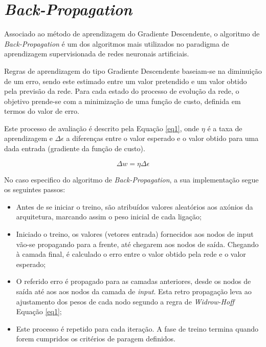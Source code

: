 \section{\textit{Back-Propagation}}
\label{sec:backProp}

Associado ao método de aprendizagem do Gradiente Descendente, o algoritmo de \textit{Back-Propagation} é um dos algoritmos mais utilizados no paradigma de aprendizagem supervisionada de redes neuronais artificiais. 

Regras de aprendizagem do tipo Gradiente Descendente baseiam-se na diminuição de um erro, sendo este estimado entre um valor pretendido e um valor obtido pela previsão da rede. \cite{Haykin-ANN}
Para cada estado do processo de evolução da rede, o objetivo prende-se com a minimização de uma função de custo, definida em termos do valor de erro. 

Este processo de avaliação é descrito pela Equação \ref{eq1}, onde $\eta$ é a taxa de aprendizagem e $\Delta \epsilon$ a diferenças entre o valor esperado e o valor obtido para uma dada entrada (gradiente da função de custo).  

\begin{equation}
    \label{eq1}
    \Delta w = \eta \Delta \epsilon
\end{equation}

No caso especifico do algoritmo de \textit{Back-Propagation}, a sua implementação segue os seguintes passos:
\begin{itemize}
    \item Antes de se iniciar o treino, são atribuídos valores aleatórios aos axónios da arquitetura, marcando assim o peso inicial de cada ligação; 
    
    \item Iniciado o treino, os valores (vetores entrada) fornecidos aos nodos de input  vão-se propagando para a frente, até chegarem aos nodos de saída. Chegando à camada final, é calculado o erro entre o valor obtido pela rede e o valor esperado; 
    
    \item O referido erro é propagado para as camadas anteriores, desde os nodos de saída até aos aos nodos da camada de \textit{input}. Esta retro propagação leva ao ajustamento dos pesos de cada nodo segundo a regra de \textit{Widrow-Hoff} Equação \ref{eq1};
    
    \item Este processo é repetido para cada iteração. A fase de treino termina quando forem cumpridos os critérios de paragem definidos.
\end{itemize}
